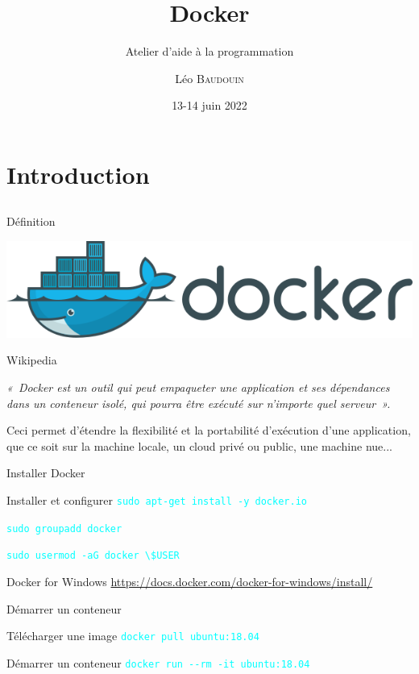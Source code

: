 \documentclass{beamer}
\title{Docker}
\subtitle{Atelier d'aide à la programmation}
\author{L\'eo \textsc{Baudouin}}
\institute{
  {\url{baudouin.leo @ gmail.com}}
}
\date{13-14 juin 2022}
\begin{document}
\begin{frame}
  \titlepage
\end{frame}

\section{Introduction}
\subsection{}

\begin{frame}{Définition}


\begin{center}
\includegraphics[width=0.5\linewidth]{images/docker-logo}
\end{center}

\begin{block}{Wikipedia}
{\it 
«~Docker est un outil qui peut empaqueter une application et ses dépendances dans un conteneur isolé, qui pourra être exécuté sur n'importe quel serveur~».

Ceci permet d'étendre la flexibilité et la portabilité d’exécution d'une application, que ce soit sur la machine locale, un cloud privé ou public, une machine nue...}
\end{block}
\end{frame}


\begin{frame}[fragile]{Installer Docker}

\begin{block}{Installer et configurer}
\textcolor{cyan}{\verb?sudo apt-get install -y docker.io?}

\textcolor{cyan}{\verb?sudo groupadd docker?}

\textcolor{cyan}{\verb?sudo usermod -aG docker \$USER?}
\end{block}

\begin{block}{Docker for Windows}
\href{https://docs.docker.com/docker-for-windows/install/}{https://docs.docker.com/docker-for-windows/install/}
\end{block}

\end{frame}


\begin{frame}{Démarrer un conteneur}

\begin{block}{Télécharger une image}
\textcolor{cyan}{\verb?docker pull ubuntu:18.04?}
\end{block}

\begin{block}{Démarrer un conteneur}
\textcolor{cyan}{\verb?docker run --rm -it ubuntu:18.04?}
\end{block}

\end{frame}
\end{document}
